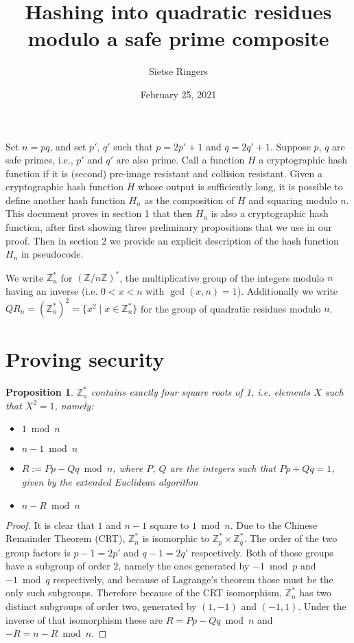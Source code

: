 \documentclass[a4paper,12pt]{article}
\title{Hashing into quadratic residues \\ modulo a safe prime composite}
\author{Sietse Ringers}
\date{February 25, 2021}
\newtheorem{proposition}{Proposition}
\newcommand{\Z}{\mathbb{Z}}
\begin{document}
\maketitle

\noindent Set $n = pq$, and set $p'$, $q'$ such that $p = 2p' + 1$ and $q = 2q' + 1$. Suppose $p$, $q$ are safe primes, i.e., $p'$ and $q'$ are also prime. Call a function $H$ a cryptographic hash function if it is (second) pre-image resistant and collision resistant. Given a cryptographic hash function $H$ whose output is sufficiently long, it is possible to define another hash function $H_n$ as the composition of $H$ and squaring modulo $n$. This document proves in section 1 that then $H_n$ is also a cryptographic hash function, after first showing three preliminary propositions that we use in our proof. Then in section 2 we provide an explicit description of the hash function $H_n$ in pseudocode.

We write $\Z^*_n$ for $(\Z/n\Z)^*$, the multiplicative group of the integers modulo $n$ having an inverse (i.e. $0 < x < n$ with $\gcd(x, n) = 1$). Additionally we write $QR_n = (\Z^*_n)^2 = \{ x^2 \mid x \in \Z^*_n \}$ for the group of quadratic residues modulo $n$.

\section{Proving security}

\begin{proposition}
$\Z^*_n$ contains exactly four square roots of 1, i.e. elements $X$ such that $X^2 = 1$, namely:
\begin{itemize}
  \item $1 \bmod n$
  \item $n - 1 \bmod n$
  \item $R := Pp - Qq \bmod n$, where $P$, $Q$ are the integers such that $Pp + Qq = 1$, given by the extended Euclidean algorithm
  \item $n - R \bmod n$
\end{itemize}
\end{proposition}

\begin{proof}
It is clear that $1$ and $n - 1$ square to $1 \bmod n$. Due to the Chinese Remainder Theorem (CRT), $\Z^*_n$ is isomorphic to $\Z^*_p \times \Z^*_q$. The order of the two group factors is $p-1 = 2p'$ and $q-1 = 2q'$ respectively. Both of those groups have a subgroup of order $2$, namely the ones generated by $-1 \bmod p$ and $-1 \bmod q$ respectively, and because of Lagrange's theorem those must be the only such subgroups. Therefore because of the CRT isomorphism, $\Z^*_n$ has two distinct subgroups of order two, generated by $(1, -1)$ and $(-1, 1)$. Under the inverse of that isomorphism these are $R = Pp - Qq \bmod n$ and $-R = n - R \bmod n$.
\end{proof}
\end{document}
